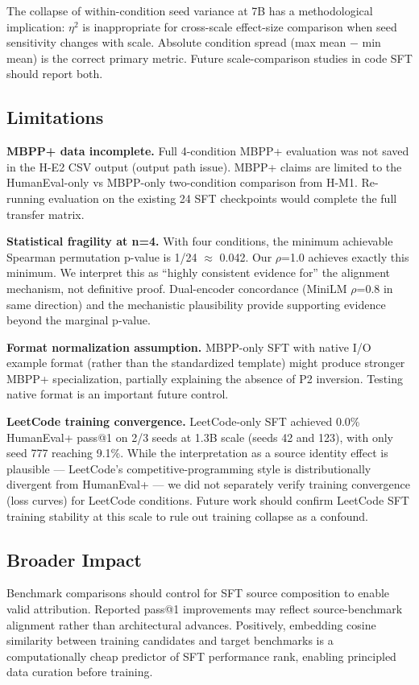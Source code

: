The collapse of within-condition seed variance at 7B has a methodological implication: $\eta^2$ is
inappropriate for cross-scale effect-size comparison when seed sensitivity changes with scale.
Absolute condition spread (max mean $-$ min mean) is the correct primary metric. Future
scale-comparison studies in code SFT should report both.

\subsection{Limitations}

\textbf{MBPP+ data incomplete.} Full 4-condition MBPP+ evaluation was not saved in the H-E2 CSV
output (output path issue). MBPP+ claims are limited to the HumanEval-only vs MBPP-only
two-condition comparison from H-M1. Re-running evaluation on the existing 24 SFT checkpoints
would complete the full transfer matrix.

\textbf{Statistical fragility at n=4.} With four conditions, the minimum achievable Spearman
permutation p-value is 1/24 $\approx$ 0.042. Our $\rho$=1.0 achieves exactly this minimum. We interpret
this as ``highly consistent evidence for'' the alignment mechanism, not definitive proof.
Dual-encoder concordance (MiniLM $\rho$=0.8 in same direction) and the mechanistic plausibility
provide supporting evidence beyond the marginal p-value.

\textbf{Format normalization assumption.} MBPP-only SFT with native I/O example format (rather than
the standardized template) might produce stronger MBPP+ specialization, partially explaining the
absence of P2 inversion. Testing native format is an important future control.

\textbf{LeetCode training convergence.} LeetCode-only SFT achieved 0.0\% HumanEval+ pass@1 on 2/3 seeds
at 1.3B scale (seeds 42 and 123), with only seed 777 reaching 9.1\%. While the interpretation as
a source identity effect is plausible --- LeetCode's competitive-programming style is
distributionally divergent from HumanEval+ --- we did not separately verify training convergence
(loss curves) for LeetCode conditions. Future work should confirm LeetCode SFT training stability
at this scale to rule out training collapse as a confound.

\subsection{Broader Impact}

Benchmark comparisons should control for SFT source composition to enable valid attribution.
Reported pass@1 improvements may reflect source-benchmark alignment rather than architectural
advances. Positively, embedding cosine similarity between training candidates and target
benchmarks is a computationally cheap predictor of SFT performance rank, enabling principled
data curation before training.
